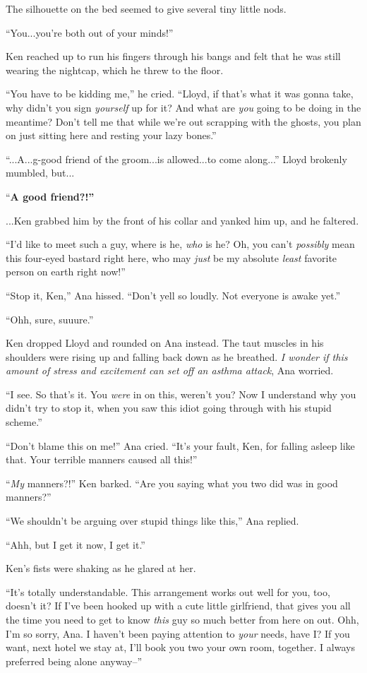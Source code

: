 \documentclass[
]{article}
\begin{document}
The silhouette on the bed seemed to give several tiny little nods.

``You...you're both out of your minds!''

Ken reached up to run his fingers through his bangs and felt that he was
still wearing the nightcap, which he threw to the floor.

``You have to be kidding me,'' he cried. ``Lloyd, if that's what it was
gonna take, why didn't you sign \emph{yourself} up for it? And what are
\emph{you} going to be doing in the meantime? Don't tell me that while
we're out scrapping with the ghosts, you plan on just sitting here and
resting your lazy bones.''

``...A...g-good friend of the groom...is allowed...to come along...''
Lloyd brokenly mumbled, but...

``\textbf{A good friend?!''}

\textbf{}...Ken grabbed him by the front of his collar and yanked him
up, and he faltered.

``I'd like to meet such a guy, where is he, \emph{who} is he? Oh, you
can't \emph{possibly} mean this four-eyed bastard right here, who may
\emph{just} be my absolute \emph{least} favorite person on earth right
now!''

``Stop it, Ken,'' Ana hissed. ``Don't yell so loudly. Not everyone is
awake yet.''

``Ohh, sure, suuure.''

Ken dropped Lloyd and rounded on Ana instead. The taut muscles in his
shoulders were rising up and falling back down as he breathed. \emph{I
wonder if this amount of stress and excitement can set off an asthma
attack}, Ana worried.

``I see. So that's it. You \emph{were} in on this, weren't you? Now I
understand why you didn't try to stop it, when you saw this idiot going
through with his stupid scheme.''

``Don't blame this on me!'' Ana cried. ``It's your fault, Ken, for
falling asleep like that. Your terrible manners caused all this!''

``\emph{My} manners?!'' Ken barked. ``Are you saying what you two did
was in good manners?''

``We shouldn't be arguing over stupid things like this,'' Ana replied.

``Ahh, but I get it now, I get it.''

Ken's fists were shaking as he glared at her.

``It's totally understandable. This arrangement works out well for you,
too, doesn't it? If I've been hooked up with a cute little girlfriend,
that gives you all the time you need to get to know \emph{this} guy so
much better from here on out. Ohh, I'm so sorry, Ana. I haven't been
paying attention to \emph{your} needs, have I? If you want, next hotel
we stay at, I'll book you two your own room, together. I always
preferred being alone anyway--''
\end{document}
